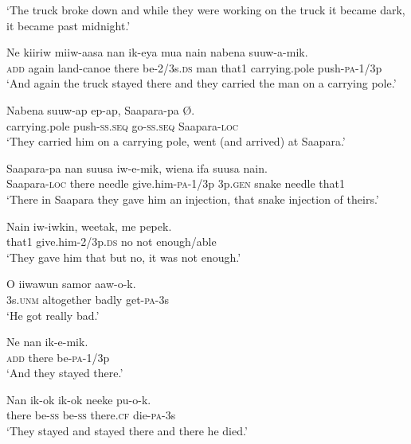 \glt ‘The truck broke down and while they were working on the truck it became dark, it became past midnight.’ \\
\z


\ea
\gll  Ne  kiiriw  miiw-aasa  nan  ik-eya  mua  nain  nabena          suuw-a-mik. \\
\textsc{add}  again  land-canoe  there  be-2/3s.\textsc{ds}  man  that1  carrying.pole push-\textsc{pa}-1/3p \\


\glt ‘And again the truck stayed there and they carried the man on a carrying pole.’ \\
\z


\ea
\gll  Nabena  suuw-ap  ep-ap,  Saapara-pa  Ø. \\
carrying.pole  push-\textsc{ss.seq}  go-\textsc{ss.seq}  Saapara-\textsc{loc} \\
\glt ‘They carried him on a carrying pole, went (and arrived) at Saapara.’ \\
\z


\ea
\gll  Saapara-pa  nan  suusa  iw-e-mik,  wiena  ifa  suusa  nain. \\
Saapara-\textsc{loc}  there  needle  give.him-\textsc{pa}-1/3p  3p.\textsc{gen}  snake  needle  that1 \\
\glt ‘There in Saapara they gave him an injection, that snake injection of theirs.’ \\
\z


\ea
\gll  Nain  iw-iwkin,  weetak,  me  pepek. \\
that1  give.him-2/3p.\textsc{ds}  no  not  enough/able \\
\glt ‘They gave him that but no, it was not enough.’ \\
\z


\ea
\gll  O  iiwawun  samor  aaw-o-k. \\
3s.\textsc{unm}  altogether  badly  get-\textsc{pa}-3s \\
\glt ‘He got really bad.’ \\
\z


\ea
\gll  Ne  nan  ik-e-mik. \\
\textsc{add}  there  be-\textsc{pa}-1/3p \\
\glt ‘And they stayed there.’ \\
\z


\ea
\gll  Nan  ik-ok  ik-ok  neeke  pu-o-k. \\
there  be-\textsc{ss}  be-\textsc{ss}  there.\textsc{cf}  die-\textsc{pa}-3s \\
\glt ‘They stayed and stayed there and there he died.’ \\
\z


